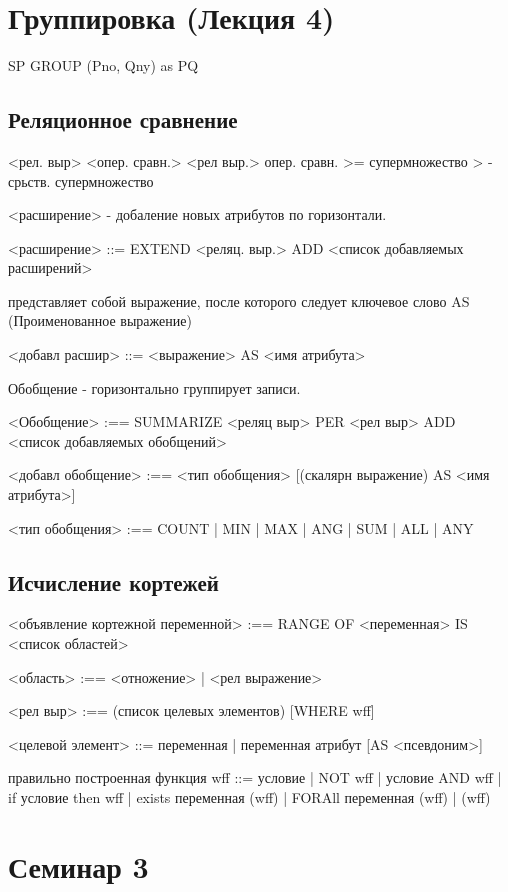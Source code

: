 \chapter{Группировка (Лекция 4)}

SP GROUP (Pno, Qny) as PQ

\section{Реляционное сравнение}

<рел. выр> <опер. сравн.> <рел выр.> опер. сравн. >= супермножество
> - срьств. супермножество

<расширение> - добаление новых атрибутов по горизонтали.

<расширение> ::= EXTEND <реляц. выр.> ADD <список добавляемых расширений>

представляет собой выражение, после которого следует ключевое слово AS (Проименованное выражение)

<добавл расшир> ::= <выражение> AS <имя атрибута>

Обобщение - горизонтально группирует записи.

<Обобщение> :== SUMMARIZE <реляц выр> PER <рел выр> ADD <список добавляемых обобщений>

	<добавл обобщение> :== <тип обобщения> [(скалярн выражение) AS <имя атрибута>]

<тип обобщения> :== COUNT | MIN | MAX | ANG | SUM | ALL | ANY

\section{Исчисление кортежей}

<объявление кортежной переменной> :== RANGE OF <переменная> IS <список областей>

<область> :== <отножение> | <рел выражение>

<рел выр> :== (список целевых элементов) [WHERE wff]

<целевой элемент> ::= переменная | переменная атрибут [AS <псевдоним>]

правильно построенная  функция wff ::= условие | NOT wff | условие AND wff | if условие then wff |
exists переменная (wff) | FORAll переменная (wff) | (wff)


\chapter{Семинар 3}

